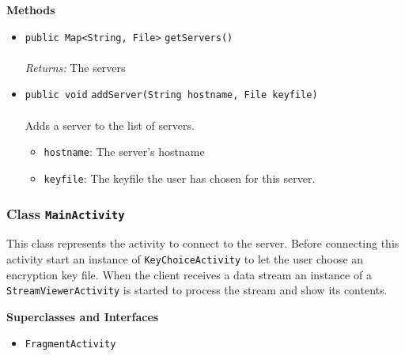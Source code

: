 \textbf{\sffamily Methods}
\begin{itemize}
\item \lstinline|public Map<String, File>| \lstinline|getServers|\lstinline|()|\\ \\[-0.6em]
\emph{Returns:} The servers



\item \lstinline|public void| \lstinline|addServer|\lstinline|(String hostname, File keyfile)|\\ \\[-0.6em]
Adds a server to the list of servers.
\begin{itemize}
\item \lstinline|hostname|: The server's hostname
\item \lstinline|keyfile|: The keyfile the user has chosen for this server.
\end{itemize}



\end{itemize}

\subsubsection{Class \lstinline|MainActivity|}
This class represents the activity to connect to the server.
 Before connecting this activity start an instance of \lstinline|KeyChoiceActivity| to
 let the user choose an encryption key file. When the client receives a
 data stream an instance of a \lstinline|StreamViewerActivity| is started to process the
 stream and show its contents. \\
\noindent\begin{minipage}[t]{5cm}
\vspace{0.3em}
\hspace*{2em}
\vspace{0.3em}
\end{minipage}



\textbf{\sffamily Superclasses and Interfaces}
\begin{itemize}
\item \lstinline|FragmentActivity|
\end{itemize}



